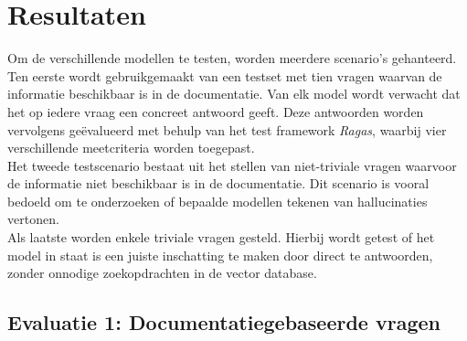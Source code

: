 
\chapter{Resultaten}
\label{ch:resultaten}







Om de verschillende modellen te testen, worden meerdere scenario’s gehanteerd.
Ten eerste wordt gebruikgemaakt van een testset met tien vragen waarvan de informatie beschikbaar is in de documentatie. Van elk model wordt verwacht dat het op iedere vraag een concreet antwoord geeft. Deze antwoorden worden vervolgens geëvalueerd met behulp van het test framework \textit{Ragas}, waarbij vier verschillende meetcriteria worden toegepast.
\\[1em]
Het tweede testscenario bestaat uit het stellen van niet-triviale vragen waarvoor de informatie niet beschikbaar is in de documentatie. Dit scenario is vooral bedoeld om te onderzoeken of bepaalde modellen tekenen van hallucinaties vertonen.
\\[1em]
Als laatste worden enkele triviale vragen gesteld. Hierbij wordt getest of het model in staat is een juiste inschatting te maken door direct te antwoorden, zonder onnodige zoekopdrachten in de vector database.

\section{Evaluatie 1: Documentatiegebaseerde vragen}

